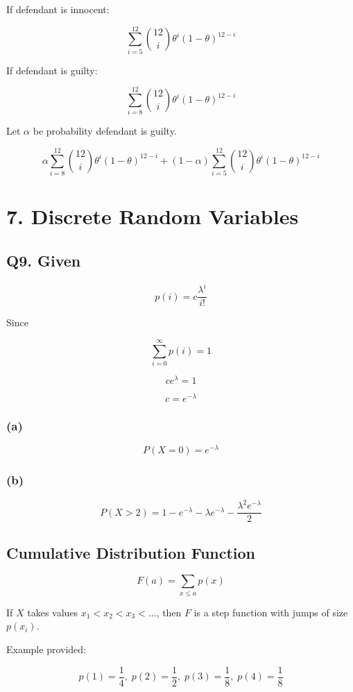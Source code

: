 \documentclass[12pt]{article}
\begin{document}
If defendant is innocent:

\[
\sum_{i=5}^{12}
\binom{12}{i}
\theta^i (1-\theta)^{12-i}
\]

If defendant is guilty:

\[
\sum_{i=8}^{12}
\binom{12}{i}
\theta^i (1-\theta)^{12-i}
\]

Let $\alpha$ be probability defendant is guilty.

\[
\alpha
\sum_{i=8}^{12}
\binom{12}{i}
\theta^i (1-\theta)^{12-i}
+
(1-\alpha)
\sum_{i=5}^{12}
\binom{12}{i}
\theta^i (1-\theta)^{12-i}
\]

\section*{7. Discrete Random Variables}

\subsection*{Q9. Given}

\[
p(i) = c\frac{\lambda^i}{i!}
\]

Since

\[
\sum_{i=0}^{\infty} p(i) = 1
\]

\[
c e^\lambda = 1
\]

\[
c = e^{-\lambda}
\]

\subsubsection*{(a)}

\[
P(X=0) = e^{-\lambda}
\]

\subsubsection*{(b)}

\[
P(X>2)
=
1 - e^{-\lambda} - \lambda e^{-\lambda} - \frac{\lambda^2 e^{-\lambda}}{2}
\]

\subsection*{Cumulative Distribution Function}

\[
F(a) = \sum_{x \le a} p(x)
\]

If $X$ takes values $x_1 < x_2 < x_3 < \dots$, then $F$ is a step function with jumps of size $p(x_i)$.

Example provided:

\[
p(1)=\frac14,\;
p(2)=\frac12,\;
p(3)=\frac18,\;
p(4)=\frac18
\]
\end{document}
